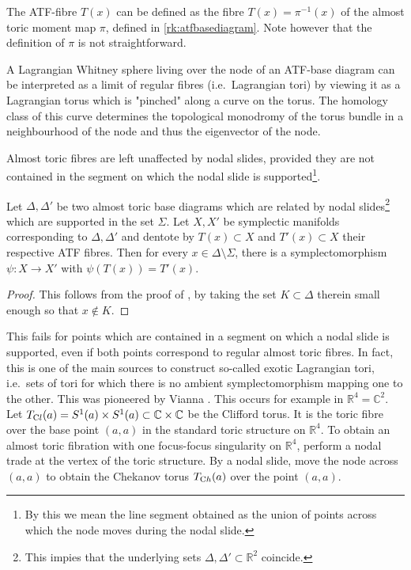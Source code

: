 \documentclass[12pt,a4paper,draft]{scrartcl}
\begin{document}
\begin{remark}
    \label{rk:atffibres}
    The ATF-fibre $T(x)$ can be defined as the fibre $T(x) = \pi^{-1}(x)$ of the almost toric moment map $\pi$, defined in \cref{rk:atfbasediagram}. Note however that the definition of $\pi$ is not straightforward. 
\end{remark}

\begin{remark}
    \label{rk:pinchedtorus}
    A Lagrangian Whitney sphere living over the node of an ATF-base diagram can be interpreted as a limit of regular fibres (i.e.\ Lagrangian tori) by viewing it as a Lagrangian torus which is "pinched" along a curve on the torus. The homology class of this curve determines the topological monodromy of the torus bundle in a neighbourhood of the node and thus the eigenvector of the node. 
\end{remark}

Almost toric fibres are left unaffected by nodal slides, provided they are not contained in the segment on which the nodal slide is supported\footnote{By this we mean the line segment obtained as the union of points across which the node moves during the nodal slide.}.

\begin{lemma}
    \label{thm:nodal_slide}
    Let $\Delta, \Delta'$ be two almost toric base diagrams which are related by nodal slides\footnote{This impies that the underlying sets $\Delta, \Delta' \subset \mathbb{R}^2$ coincide.} which are supported in the set $\Sigma$. Let $X,X'$ be symplectic manifolds corresponding to $\Delta,\Delta'$ and dentote by $T(x) \subset X$ and $T'(x) \subset X$ their respective ATF fibres. Then for every $x \in \Delta \setminus \Sigma$, there is a symplectomorphism $\psi \colon X \rightarrow X'$ with $\psi(T(x)) = T'(x)$.
\end{lemma}

\begin{proof}
    This follows from the proof of \cite[Theorem 8.10]{evans2021atfs}, by taking the set $K \subset \Delta$ therein small enough so that $x \notin K$.
\end{proof}

\begin{remark}
    This fails for points which are contained in a segment on which a nodal slide is supported, even if both points correspond to regular almost toric fibres. In fact, this is one of the main sources to construct so-called exotic Lagrangian tori, i.e.\ sets of tori for which there is no ambient symplectomorphism mapping one to the other. This was pioneered by Vianna \cite{Via16,Via17}. This occurs for example in $\mathbb{R}^4 = \mathbb{C}^2$. Let $T_{\text Cl}(a) = S^1(a) \times S^1(a) \subset \mathbb{C} \times \mathbb{C}$ be the Clifford torus. It is the toric fibre over the base point $(a,a)$ in the standard toric structure on $\mathbb{R}^4$. To obtain an almost toric fibration with one focus-focus singularity on $\mathbb{R}^4$, perform a nodal trade at the vertex of the toric structure. By a nodal slide, move the node across $(a,a)$ to obtain the Chekanov torus $T_{\text Ch}(a)$ over the point $(a,a)$.
\end{remark}
\end{document}
